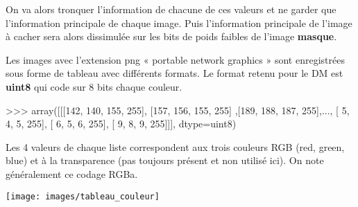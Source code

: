 \documentclass[10pt]{article}
\begin{document}
On va alors tronquer l’information de chacune de ces valeurs et ne garder que l’information principale de chaque image. Puis l’information principale de l’image à cacher sera alors dissimulée sur les bits de poids faibles de l’image \textbf{masque}.

\vspace{0.5cm}
Les images avec l’extension png « portable network graphics » sont enregistrées sous forme de tableau avec différents formats. Le format retenu pour le DM est \textbf{uint8} qui code sur 8 bits chaque couleur.

\begin{python}
>>> array([[[142, 140, 155, 255], [157, 156, 155, 255] ,[189, 188, 187, 255],..., [ 5, 4, 5, 255], [ 6, 5, 6, 255], [ 9, 8, 9, 255]]], dtype=uint8)
\end{python}

Les 4 valeurs de chaque liste correspondent aux trois couleurs RGB (red, green, blue) et à la transparence (pas toujours présent et non utilisé ici). On note généralement ce codage RGBa.

\begin{center}
\texttt{[image: images/tableau\_couleur]}
\end{center}
\end{document}
